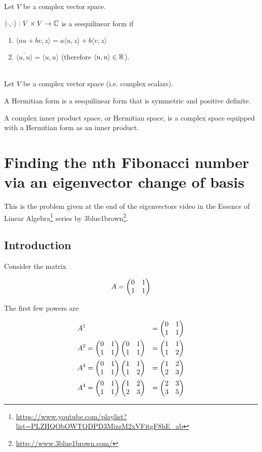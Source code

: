 \begin{definition*}
  Let $V$ be a complex vector space.

  $\langle \cdot, \cdot \rangle:V \times V \to \mathbb{C}$ is a sesquilinear form if
  \begin{enumerate}
  \item $\langle au + bv, z \rangle = a\langle u, z \rangle + b\langle v, z \rangle$
  \item $\bar{\langle u, u \rangle} = \langle u, u \rangle$ (therefore
    $\langle u, u \rangle \in \mathbb{R}$).
  \end{enumerate}
\end{definition*}


\begin{definition*}~\\
  Let $V$ be a complex vector space (i.e. complex scalars).

  A Hermitian form is a sesquilinear form that is symmetric and positive definite.

  A complex inner product space, or Hermitian space, is a complex space equipped with a Hermitian
  form as an inner product.
\end{definition*}


\section{Finding the nth Fibonacci number via an eigenvector change of basis}


This is the problem given at the end of the eigenvectors video in the
Essence of Linear Algebra\footnote{\url{https://www.youtube.com/playlist?list=PLZHQObOWTQDPD3MizzM2xVFitgF8hE_ab}}
series by 3blue1brown\footnote{\url{http://www.3blue1brown.com/}}.


\subsection*{Introduction}

Consider the matrix

$$
A = \begin{pmatrix}0 & 1\\1 & 1\\ \end{pmatrix}
$$

The first few powers are

\begin{align*}
&A^{1} &= \begin{pmatrix}0 & 1\\1 & 1\\ \end{pmatrix}
\\
&A^{2} = \begin{pmatrix}0 & 1\\1 & 1\\ \end{pmatrix} \begin{pmatrix}0 & 1\\1 & 1\\ \end{pmatrix} &= \begin{pmatrix}1 & 1\\1 & 2\\ \end{pmatrix}
\\
&A^{3} = \begin{pmatrix}0 & 1\\1 & 1\\ \end{pmatrix} \begin{pmatrix}1 & 1\\1 & 2\\ \end{pmatrix} &= \begin{pmatrix}1 & 2\\2 & 3\\ \end{pmatrix}
\\
&A^{4} = \begin{pmatrix}0 & 1\\1 & 1\\ \end{pmatrix} \begin{pmatrix}1 & 2\\2 & 3\\ \end{pmatrix} &= \begin{pmatrix}2 & 3\\3 & 5\\ \end{pmatrix}
\end{align*}

